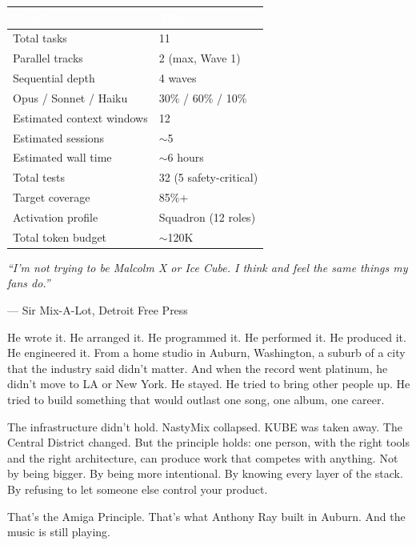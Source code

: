 \documentclass[11pt,letterpaper]{article}
\newcommand{\tableheader}[1]{\textbf{\sffamily\textcolor{white}{#1}}}
\begin{document}
\begin{center}
\begin{tabularx}{\textwidth}{L{4cm}X}
\toprule
{}
\tableheader{Metric} & \tableheader{Value} \\
\midrule
Total tasks & 11 \\
Parallel tracks & 2 (max, Wave 1) \\
Sequential depth & 4 waves \\
Opus / Sonnet / Haiku & 30\% / 60\% / 10\% \\
Estimated context windows & 12 \\
Estimated sessions & $\sim$5 \\
Estimated wall time & $\sim$6 hours \\
Total tests & 32 (5 safety-critical) \\
Target coverage & 85\%+ \\
Activation profile & Squadron (12 roles) \\
Total token budget & $\sim$120K \\
\bottomrule
\end{tabularx}
\end{center}

\vspace{1em}

\begin{quotebox}
\textit{``I'm not trying to be Malcolm X or Ice Cube. I think and feel the same things my fans do.''}

\vspace{0.5em}

--- Sir Mix-A-Lot, Detroit Free Press

\vspace{0.5em}

He wrote it. He arranged it. He programmed it. He performed it. He produced it. He engineered it. From a home studio in Auburn, Washington, a suburb of a city that the industry said didn't matter. And when the record went platinum, he didn't move to LA or New York. He stayed. He tried to bring other people up. He tried to build something that would outlast one song, one album, one career.

The infrastructure didn't hold. NastyMix collapsed. KUBE was taken away. The Central District changed. But the principle holds: one person, with the right tools and the right architecture, can produce work that competes with anything. Not by being bigger. By being more intentional. By knowing every layer of the stack. By refusing to let someone else control your product.

That's the Amiga Principle. That's what Anthony Ray built in Auburn. And the music is still playing.
\end{quotebox}
\end{document}
